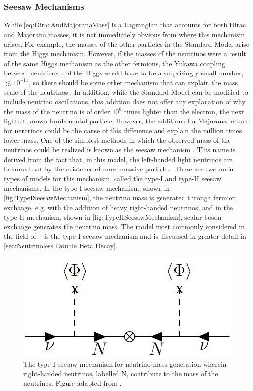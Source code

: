 \subsubsection{Seesaw Mechanisms}
\label{sssec:Seesaw Mechanism}
While \autoref{eq:DiracAndMajoranaMass} is a Lagrangian that accounts for both Dirac and Majorana masses, it is not immediately obvious from where this mechanism arises.
For example, the masses of the other particles in the Standard Model arise from the Higgs mechanism.
However, if the masses of the neutrinos were a result of the same Higgs mechanism as the other fermions, the Yukawa coupling between neutrinos and the Higgs would have to be a surprisingly small number, $\lesssim 10^{-11}$, so there should be some other mechanism that can explain the mass scale of the neutrinos \cite{Merle:2013gea}.
In addition, while the Standard Model can be modified to include neutrino oscillations, this addition does not offer any explanation of why the mass of the neutrino is of order $10^6$ times lighter than the electron, the next lightest known fundamental particle.
However, the addition of a Majorana nature for neutrinos could be the cause of this difference and explain the million times lower mass.
One of the simplest methods in which the observed mass of the neutrinos could be realized is known as the seesaw mechanism \cite{PhysRevD.22.2227}.
This name is derived from the fact that, in this model, the left-handed light neutrinos are balanced out by the existence of more massive particles.
There are two main types of models for this mechanism, called the type-I and type-II seesaw mechanisms.
In the type-I seesaw mechanism, shown in \autoref{fig:TypeISeesawMechanism}, the neutrino mass is generated through fermion exchange, e.g. with the addition of heavy right-handed neutrinos, and in the type-II mechanism, shown in \autoref{fig:TypeIISeesawMechanism}, scalar boson exchange generates the neutrino mass.
The model most commonly considered in the field of \zeronubb~ is the type-I seesaw mechanism and is discussed in greater detail in \autoref{sec:Neutrinoless Double Beta Decay}.
\begin{figure}[tbph]
\centering
\includegraphics[width=0.40\linewidth]{Figures/TypeISeesaw.png}
\caption[Type-I seesaw mechanism]
{The type-I seesaw mechanism for neutrino mass generation wherein right-handed neutrinos, labelled $\textrm{N}$, contribute to the mass of the neutrinos.
Figure adapted from \cite{MIRANDA2016436}.}
\label{fig:TypeISeesawMechanism}
\end{figure}
